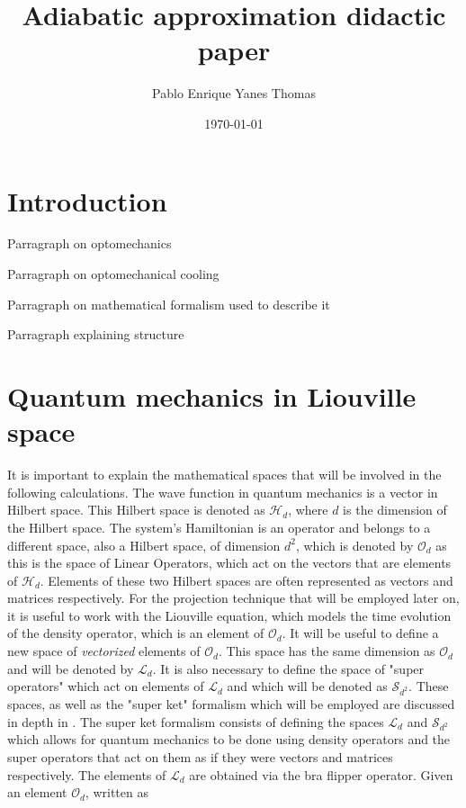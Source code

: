 \documentclass[12pt]{article}
\begin{document}
\title{Adiabatic approximation didactic paper}
\author{Pablo Enrique Yanes Thomas}
\date{\today}


\maketitle

\section{Introduction}
 Parragraph on optomechanics
 
 Parragraph on optomechanical cooling
 
 Parragraph on  mathematical formalism used to describe it
 
 Parragraph explaining structure


\section{Quantum mechanics in Liouville space}

It is important to explain the mathematical spaces that will be involved in the following calculations. The wave function in quantum mechanics is a vector in Hilbert space. This Hilbert space is denoted as $\mathcal{H}_d$, where $d$ is the dimension of the Hilbert space. The system's Hamiltonian is an operator and belongs to a different space, also a Hilbert space, of dimension $d^2$, which is denoted by $\mathcal{O}_d$ as this is the space of Linear Operators, which act on the vectors that are elements of $\mathcal{H}_d$. Elements of these two Hilbert spaces are often represented as vectors and matrices respectively. For the projection technique that will be employed later on, it is useful to work with the Liouville equation, which models the time evolution of the density operator, which is an element of $\mathcal{O}_d$. It will be useful to define a new space of \textit{vectorized} elements of $\mathcal{O}_d$. This space has the same dimension as $\mathcal{O}_d$ and will be denoted by $\mathcal{L}_d$. It is also necessary to define the space of "super operators" which act on elements of $\mathcal{L}_d$ and which will be denoted as $\mathcal{S}_{d^2}$. These spaces, as well as the "super ket" formalism which will be employed are discussed in depth in \cite{GyamfiLiouvilleSpace2020}. The super ket formalism consists of defining the spaces $\mathcal{L}_d$ and $\mathcal{S}_{d^2}$ which allows for quantum mechanics to be done using density operators and the super operators that act on them as if they were vectors and matrices respectively. The elements of $\mathcal{L}_d$ are obtained via the bra flipper operator. Given an element $\mathcal{O}_d$, written as
\end{document}
